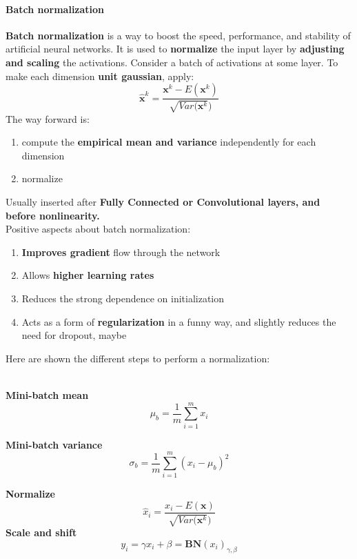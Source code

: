 \documentclass[11pt]{article}
\begin{document}
\paragraph{Batch normalization}
\textbf{Batch normalization} is a way to boost the speed, performance, and stability of artificial neural networks. It is used to \textbf{normalize} the input layer by \textbf{adjusting and scaling} the activations. Consider a batch of activations at some layer. To make each dimension \textbf{unit gaussian}, apply:
\begin{equation}
    \hat{\mathbf{x}}^k=\frac{\mathbf{x}^k -E(\mathbf{x}^k)}{\sqrt{Var(\mathbf{x}^k})}
\end{equation}{}
The way forward is:
\begin{enumerate}
    \item compute the \textbf{empirical mean and variance} independently for each dimension
    \item normalize
\end{enumerate}{}
Usually inserted after \textbf{Fully Connected or Convolutional layers, and before nonlinearity.}\\
Positive aspects about batch normalization:
\begin{enumerate}
    \item \textbf{Improves gradient} flow through the network
    \item Allows \textbf{higher learning rates}
    \item Reduces the strong dependence on initialization
    \item Acts as a form of \textbf{regularization} in a funny way, and slightly reduces the need for dropout, maybe
\end{enumerate}{}
Here are shown the different steps to perform a normalization:\\\\
\begin{minipage}{0.5\textwidth}
\textbf{Mini-batch mean}
\begin{equation}
    \mu_b=\frac{1}{m}\sum_{i=1}^{m}x_i
\end{equation}{}

\textbf{Mini-batch variance}
\begin{equation}
    \sigma_b=\frac{1}{m}\sum_{i=1}^{m}(x_i-\mu_b)^2
\end{equation}{}

\end{minipage}
\begin{minipage}{0.5\textwidth}
\textbf{Normalize}
\begin{equation}
     \hat{x}_i=\frac{x_i -E(\mathbf{x})}{\sqrt{Var(\mathbf{x}^k})}
\end{equation}{}
\textbf{Scale and shift}
\begin{equation}
    y_i= \gamma x_i+\beta=\mathbf{BN}(x_i)_{\gamma,\beta}
\end{equation}{}
\end{minipage}\\
\end{document}

